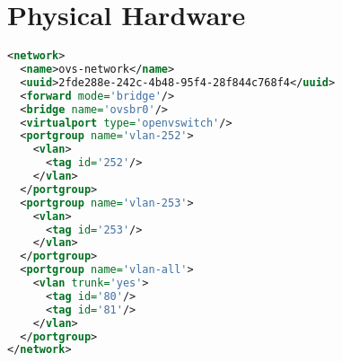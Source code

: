 \documentclass[11pt,letterpaper,oneside]{book}
\begin{document}
\begin{comment}
\begin{lstlisting}[caption={Current Default Route},language=bash]
[root@virsatpaw001 ~]# ip route
192.168.122.0/24 dev eth0  proto kernel  scope link  src 192.168.122.10
169.254.0.0/16 dev eth0  scope link  metric 1002 
default via 192.168.122.1 dev eth0 
\end{lstlisting}
Line 4 displays our current default gateway of 192.168.122.1.

\begin{lstlisting}[caption={Current Resolver},language=bash]
[root@virsatpaw001 ~]# cat /etc/resolv.conf
nameserver 192.168.122.1
\end{lstlisting}


Based on your device name there will be a corresponding ifcfg file.  DEVICE, IPADDR, NETMASK, GATEWAY and DNS1,2 will be based on your network.  Modify the file removing options that don't exist in the example below, adding the options that do.
\begin{lstlisting}[caption={Modify Ethernet interface from DHCP to static},language=bash]
vi /etc/sysconfig/network-scripts/ifcfg-
\end{lstlisting}

\begin{lstlisting}[caption={Example Ethernet configuration},language=bash]
DEVICE=eth0
TYPE=Ethernet
ONBOOT=yes
NM_CONTROLLED=no
BOOTPROTO=static
NAME="eth0"
IPADDR=192.168.122.10
NETMASK=255.255.255.0
GATEWAY=192.168.122.1
DNS1=192.168.122.1
\end{lstlisting}
At this point let us reboot.  When the virtual machine is available make sure that you can still reach the default gateway, then proceed to the next section.

\end{comment}

\chapter{Physical Hardware}
\begin{lstlisting}[caption={Open vSwitch},language=xml]
<network>
  <name>ovs-network</name>
  <uuid>2fde288e-242c-4b48-95f4-28f844c768f4</uuid>
  <forward mode='bridge'/>
  <bridge name='ovsbr0'/>
  <virtualport type='openvswitch'/>
  <portgroup name='vlan-252'>
    <vlan>
      <tag id='252'/>
    </vlan>
  </portgroup>
  <portgroup name='vlan-253'>
    <vlan>
      <tag id='253'/>
    </vlan>
  </portgroup>
  <portgroup name='vlan-all'>
    <vlan trunk='yes'>
      <tag id='80'/>
      <tag id='81'/>
    </vlan>
  </portgroup>
</network>
\end{lstlisting}
\end{document}
